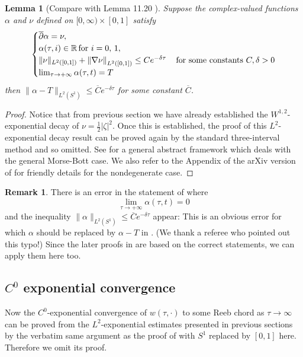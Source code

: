 \documentclass[reqno]{amsart}
\def\R{\ifmmode{\mathbb R}\else{$\mathbb R$}\fi} %
\newcommand{\beastar}{\begin{eqnarray*}}
\newcommand{\eeastar}{\end{eqnarray*}}
\theoremstyle{theorem}
\newtheorem{lem}[thm]{Lemma}
\theoremstyle{definition}
\newtheorem{rem}[thm]{Remark}
\numberwithin{equation}{section}
\def\R{{\mathbb R}}
\def\R{{\mathbb R}}
\def\delbar{{\overline \partial}}
\def\R{\ifmmode{\mathbb R}\else{$\mathbb R$}\fi} %
\def\R{{\mathbb R}}
\def\R{{\mathbb R}}
\def\delbar{{\overline \partial}}
\begin{document}
\begin{lem}[Compare with Lemma 11.20 \cite{oh-wang:CR-map2}]\label{lem:exp-decay-lemma}
Suppose the complex-valued functions $\alpha$ and $\nu$ defined on $[0, \infty)\times [0,1]$
satisfy
\beastar
\begin{cases}
\delbar \alpha = \nu, \\
\alpha(\tau, i) \in \R \,   \text{\rm for } i = 0,\, 1, \\
\|\nu\|_{L^2([0,1])}+\left\|\nabla\nu\right\|_{L^2([0,1])}\leq Ce^{-\delta \tau}
\, & \text{\rm for some constants } C, \delta>0\\
\lim_{\tau\rightarrow +\infty}\alpha(\tau,t) = T
\end{cases}
\eeastar
then $\|\alpha -T\|_{L^2(S^1)}\leq \overline{C}e^{-\delta \tau}$
for some constant $\overline{C}$.
\end{lem}
\begin{proof}
Notice that from previous section we have already
established the $W^{1, 2}$-exponential decay of $\nu = \frac{1}{2}|\zeta|^2$.
Once this is established, the proof of this $L^2$-exponential decay result
can be proved again by the standard three-interval method
and so omitted. See \cite[Theorem 10.11]{oh-wang:CR-map2} for a general abstract framework
which deals with the general Morse-Bott case. We also refer to
the Appendix of the arXiv version of \cite{oh-wang:CR-map1} for friendly details for the nondegenerate
case.
\end{proof}

\begin{rem} There is an error in the statement of \cite[Lemma 11.20]{oh-wang:CR-map2}
where
$$
\lim_{\tau\rightarrow +\infty}\alpha(\tau,t) = 0
$$
and the inequality $\|\alpha\|_{L^2(S^1)}\leq \overline{C}e^{-\delta \tau}$ appear:
This is an obvious error for which $\alpha$ should be replaced by $\alpha - T$ in
\cite[Lemma 11.20]{oh-wang:CR-map2}. (We thank a referee who pointed out this typo!)
Since the later proofs in \cite{oh-wang:CR-map2} are based on the correct statements,
we can apply them here too.
\end{rem}

\subsection{$C^0$ exponential convergence}

Now the $C^0$-exponential convergence of $w(\tau,\cdot)$ to some Reeb chord as $\tau \to \infty$
can be proved from the $L^2$-exponential estimates presented in previous sections by
the verbatim same argument as the proof of \cite[Proposition 11.21]{oh-wang:CR-map2}
with $S^1$ replaced by $[0,1]$ here. Therefore we omit its proof.
\end{document}
